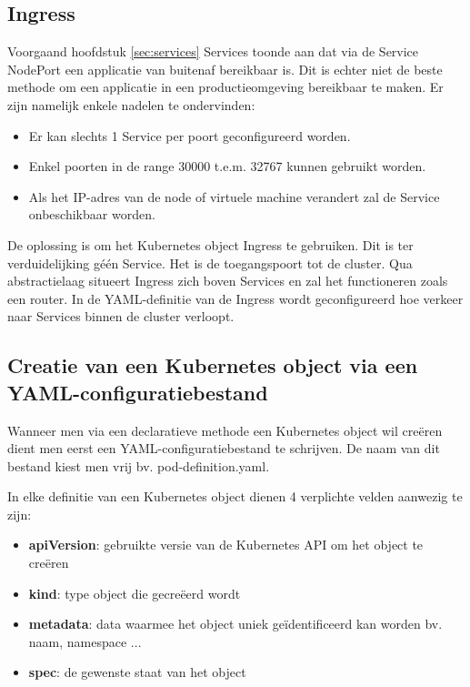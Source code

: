 \subsection{Ingress}

Voorgaand hoofdstuk \ref{sec:services} Services toonde aan dat via de Service NodePort een applicatie van buitenaf bereikbaar is. Dit is echter niet de beste methode om een applicatie in een productieomgeving bereikbaar te maken. \autocite{Dinesh2018} Er zijn namelijk enkele nadelen te ondervinden: 
\begin{itemize}
    \item Er kan slechts 1 Service per poort geconfigureerd worden.
    \item Enkel poorten in de range 30000 t.e.m. 32767 kunnen gebruikt worden.
    \item Als het IP-adres van de node of virtuele machine verandert zal de Service onbeschikbaar worden.
\end{itemize} 

De oplossing is om het Kubernetes object Ingress te gebruiken. Dit is ter verduidelijking géén Service. Het is de toegangspoort tot de cluster. Qua abstractielaag situeert Ingress zich boven Services en zal het functioneren zoals een router. 
In de YAML-definitie van de Ingress wordt geconfigureerd hoe verkeer naar Services binnen de cluster verloopt. 

\subsection{Creatie van een Kubernetes object via een YAML-configuratiebestand}

Wanneer men via een declaratieve methode een Kubernetes object wil creëren dient men eerst een YAML-configuratiebestand te schrijven. De naam van dit bestand kiest men vrij bv. pod-definition.yaml.

In elke definitie van een Kubernetes object dienen 4 verplichte velden aanwezig te zijn:
\begin{itemize}
    \item {\bf apiVersion}: gebruikte versie van de Kubernetes API om het object te creëren
    \item {\bf kind}: type object die gecreëerd wordt
    \item {\bf metadata}: data waarmee het object uniek geïdentificeerd kan worden bv. naam, namespace ...
    \item {\bf spec}: de gewenste staat van het object
\end{itemize}

